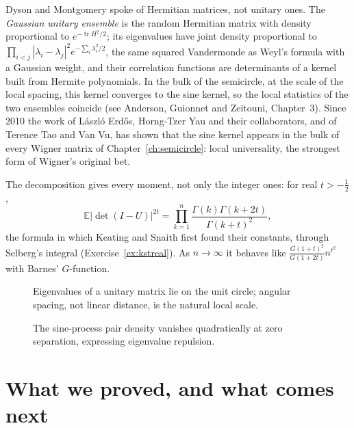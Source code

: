 \begin{remark}
Dyson and Montgomery spoke of Hermitian matrices, not unitary ones. The \emph{Gaussian unitary ensemble} is the random Hermitian matrix with density proportional to $e^{-\operatorname{tr}H^2/2}$; its eigenvalues have joint density proportional to
$\prod_{i<j}|\lambda_i-\lambda_j|^2e^{-\sum_i\lambda_i^2/2}$, the same squared Vandermonde as Weyl's formula with a Gaussian weight, and their correlation functions are determinants of a kernel built from Hermite polynomials. In the bulk of the
semicircle, at the scale of the local spacing, this kernel converges to the sine kernel, so the local statistics of the two ensembles coincide (see Anderson, Guionnet and Zeitouni, Chapter~3). Since 2010 the work of
L\'aszl\'o Erd\H os, Horng-Tzer Yau and their collaborators, and of Terence Tao and Van Vu, has shown that the sine kernel appears in the bulk of every Wigner matrix of Chapter~\ref{ch:semicircle}: local universality, the strongest form of
Wigner's original bet.
\end{remark}

\begin{remark}
The decomposition gives every moment, not only the integer ones: for real $t>-\frac12$,
\[
\mathbb E|\det(I-U)|^{2t}=\prod_{k=1}^n\frac{\Gamma(k)\Gamma(k+2t)}{\Gamma(k+t)^2},
\]
the formula in which Keating and Snaith first found their constants, through Selberg's integral (Exercise~\ref{ex:kstreal}). As $n\to\infty$ it behaves like $\frac{G(1+t)^2}{G(1+2t)}n^{t^2}$ with Barnes' $G$-function.
\end{remark}

\begin{figure}[ht]
\centering
{}
\caption{Eigenvalues of a unitary matrix lie on the unit circle; angular spacing, not linear distance, is the natural local scale.}
\label{fig:v12cuecircle}
\end{figure}

\begin{figure}[ht]
\centering
{}
\caption{The sine-process pair density vanishes quadratically at zero separation, expressing eigenvalue repulsion.}
\label{fig:v12sineexclusion}
\end{figure}

\section{What we proved, and what comes next}

